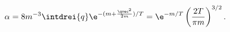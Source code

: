 \begin{equation}
\label{eq:alpha}
  \alpha=8m^{-3}\intdrei{q} \e^{-(m+\frac{\qvec^2}{2m})/T}
 =\e^{-m/T}\left(\frac{2T}{\pi m}\right)^{3/2}.
\end{equation}


